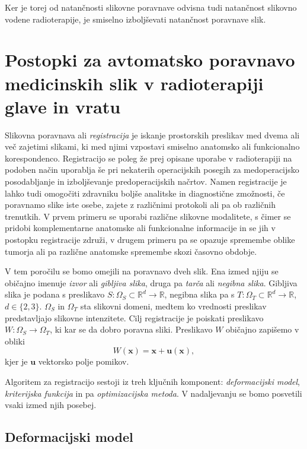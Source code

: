 \documentclass[journal]{IEEEtran}
\begin{document}
Ker je torej od natančnosti slikovne poravnave odvisna tudi natančnost slikovno vodene radioterapije, je smiselno izboljševati natančnost poravnave slik.

\section{Postopki za avtomatsko poravnavo medicinskih slik v radioterapiji glave in vratu}

Slikovna poravnava ali \emph{registracija} je iskanje prostorskih preslikav med dvema ali več zajetimi slikami, ki med njimi vzpostavi smiselno anatomsko ali funkcionalno korespondenco. Registracijo se poleg že prej opisane uporabe v radioterapiji na podoben način uporablja še pri nekaterih operacijskih posegih za medoperacijsko posodabljanje in izboljševanje predoperacijskih načrtov. Namen registracije je lahko tudi omogočiti zdravniku boljše analitske in diagnostične zmožnosti, če poravnamo slike iste osebe, zajete z različnimi protokoli ali pa ob različnih trenutkih. V prvem primeru se uporabi različne slikovne modalitete, s čimer se pridobi komplementarne anatomske ali funkcionalne informacije in se jih v postopku registracije združi, v drugem primeru pa se opazuje spremembe oblike tumorja ali pa različne anatomske spremembe skozi časovno obdobje.

V tem poročilu se bomo omejili na poravnavo dveh slik. Ena izmed njiju se običajno imenuje \emph{izvor} ali \emph{gibljiva slika}, druga pa \emph{tarča} ali \emph{negibna slika}. Gibljiva slika je podana s preslikavo $S\colon\Omega_S\subset\mathbb{R}^d\to\mathbb{R}$, negibna slika pa s $T\colon\Omega_T\subset\mathbb{R}^d\to\mathbb{R}$, $d\in\{2,3\}$. $\Omega_S$ in $\Omega_T$ sta slikovni domeni, medtem ko vrednosti preslikav predstavljajo slikovne intenzitete. Cilj registracije je poiskati preslikavo $W\colon\Omega_S\to\Omega_T$, ki kar se da dobro poravna sliki. Preslikavo $W$ običajno zapišemo v obliki
\begin{equation}
 W(\boldsymbol{x}) = \boldsymbol{x} + \boldsymbol{u}(\boldsymbol{x}),
\end{equation}
kjer je $\boldsymbol{u}$ vektorsko polje pomikov.

Algoritem za registracijo sestoji iz treh ključnih komponent: \emph{deformacijski model}, \emph{kriterijska funkcija} in pa \emph{optimizacijska metoda}. V nadaljevanju se bomo posvetili vsaki izmed njih posebej.

\subsection{Deformacijski model}
\end{document}
